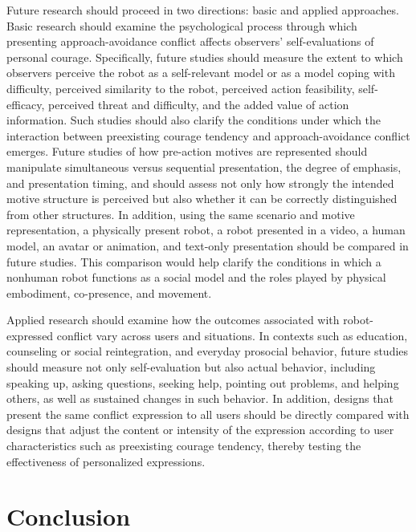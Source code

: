 \documentclass[utf8]{FrontiersinHarvard}
\begin{document}
Future research should proceed in two directions: basic and applied approaches. Basic research should examine the psychological process through which presenting approach-avoidance conflict affects observers' self-evaluations of personal courage. Specifically, future studies should measure the extent to which observers perceive the robot as a self-relevant model or as a model coping with difficulty, perceived similarity to the robot, perceived action feasibility, self-efficacy, perceived threat and difficulty, and the added value of action information. Such studies should also clarify the conditions under which the interaction between preexisting courage tendency and approach-avoidance conflict emerges. Future studies of how pre-action motives are represented should manipulate simultaneous versus sequential presentation, the degree of emphasis, and presentation timing, and should assess not only how strongly the intended motive structure is perceived but also whether it can be correctly distinguished from other structures. In addition, using the same scenario and motive representation, a physically present robot, a robot presented in a video, a human model, an avatar or animation, and text-only presentation should be compared in future studies. This comparison would help clarify the conditions in which a nonhuman robot functions as a social model and the roles played by physical embodiment, co-presence, and movement.

Applied research should examine how the outcomes associated with robot-expressed conflict vary across users and situations. In contexts such as education, counseling or social reintegration, and everyday prosocial behavior, future studies should measure not only self-evaluation but also actual behavior, including speaking up, asking questions, seeking help, pointing out problems, and helping others, as well as sustained changes in such behavior. In addition, designs that present the same conflict expression to all users should be directly compared with designs that adjust the content or intensity of the expression according to user characteristics such as preexisting courage tendency, thereby testing the effectiveness of personalized expressions.

\section{Conclusion}\label{conclusion}
\end{document}
